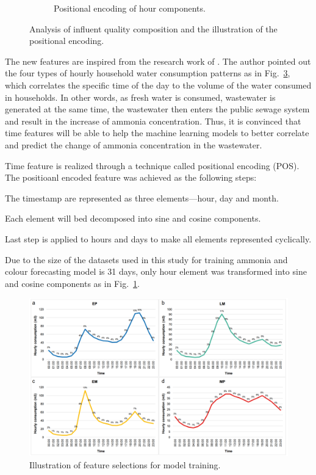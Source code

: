 \begin{figure}[h]
\begin{subfigure}[t]{0.45\textwidth}
      \caption{Positional encoding of hour components.} \label{fig:pos-encoding}
    \end{subfigure}%
  \caption{Analysis of influent quality composition and the illustration of the positional encoding.} \label{fig:blend-pos}
\end{figure}

The new features are inspired from the research work of \citet{abu-bakarQuantifyingImpactCOVID192021}. The author pointed out the four types of hourly household water consumption patterns as in Fig.~\ref{fig:water-consumption-pattern}, which correlates the specific time of the day to the volume of the water consumed in households. In other words, as fresh water is consumed, wastewater is generated at the same time, the wastewater then enters the public sewage system and result in the increase of ammonia concentration. Thus, it is convinced that time features will be able to help the machine learning models to better correlate and predict the change of ammonia concentration in the wastewater. 

Time feature is realized through a technique called positional encoding (POS). The positioanl encoded feature was achieved as the following steps:

\noindent
\begin{myenumerate}
    \item The timestamp are represented as three elements---hour, day and month.
    \item Each element will bed decomposed into sine and cosine components.
    \item Last step is applied to hours and days to make all elements represented cyclically.
\end{myenumerate}

Due to the size of the datasets used in this study for training ammonia and colour forecasting model is 31 days, only hour element was transformed into sine and cosine components as in Fig.~\ref{fig:pos-encoding}.

\begin{figure}[h]
    \centering
    \includegraphics[width=0.8\columnwidth]{imgs/pre-processing/hourly-consumption-pattern.png}
    \caption{Illustration of feature selections for model training.}
    \label{fig:water-consumption-pattern}
 \end{figure}

